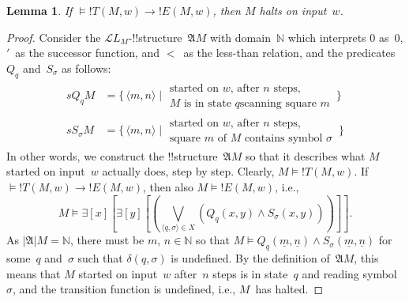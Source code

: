 \documentclass[10pt,a4paper]{article}
\theoremstyle{plain}
\newtheorem{lem}[thm]{Lemma}
\theoremstyle{definition}
\theoremstyle{remark}
\newcommand*{\ollabel}[1]{\label{#1}}
\providecommand{\lif}{\mathbin{\rightarrow}}
\providecommand{\lexists}{\mathord{\exists}}
\providecommand{\Entails}{\mathrel{\models}}
\providecommand{\Obj}{}
\providecommand{\Struct}{\ensuremath{\mathfrak{A}}}
\providecommand{\Domain}{\ensuremath{|\mathfrak{A}|}}
\providecommand{\Assign}{\ensuremath{s}}
\providecommand{\Sat}[2]{\ensuremath{#1 \models #2}}
\providecommand{\Lang}{\ensuremath{\mathcal{L}}}
\providecommand{\tuple}[1]{\langle #1 \rangle}
\providecommand{\num}[1]{\underline{#1}}
\providecommand{\Nat}{\ensuremath{\mathbb{N}}}
\providecommand{\Setabs}[2]{\{\, #1 \mid #2 \,\}}
\begin{document}
\begin{lem}
\ollabel{lem:halt-if-valid}
If $\Entails !T(M, w) \lif !E(M, w)$, then $M$ halts on input~$w$.
\end{lem}

\begin{proof}
Consider the $\Lang L_M$-!!{structure}~$\Struct M$ with
domain~$\Nat$ which interprets $\Obj 0$ as~$0$, $\prime$~as the successor
function, and $<$~as the less-than relation, and the predicates $\Obj Q_q$
and~$\Obj S_\sigma$ as follows:
\begin{align*}
  \Assign{\Obj Q_q}{M} & =
\Setabs{\tuple{m, n}}{\begin{array}{ll}\text{started on~$w$, after~$n$ steps,}\\ \text{$M$ is in state $q$
  scanning square~$m$}\end{array}} \\
\Assign{\Obj S_\sigma}{M} & = \Setabs{\tuple{m, n}}{\begin{array}{ll}
\text{started on~$w$, after $n$ steps,}\\ \text{square~$m$ of $M$ contains
  symbol~$\sigma$}\end{array}}
\end{align*}
In other words, we construct the !!{structure}~$\Struct{M}$ so that it
describes what $M$ started on input~$w$ actually does, step by step.
Clearly, $\Sat{M}{!T(M, w)}$. If $\Entails !T(M, w) \lif !E(M, w)$,
then also $\Sat{M}{!E(M, w)}$, i.e.,
\[
\Sat{M}{\lexists[x][\lexists[y][(\bigvee_{\tuple{q, \sigma} \in
      X}(\Obj Q_q(x, y) \land \Obj S_\sigma(x, y)))]]}.
\]
As $\Domain{M} = \Nat$, there must be $m$, $n \in \Nat$ so that
$\Sat{M}{\Obj Q_q(\num{m}, \num{n}) \land \Obj S_\sigma(\num{m},
\num{n})}$ for some~$q$ and~$\sigma$ such that $\delta(q, \sigma)$ is
undefined. By the definition of~$\Struct M$, this means that $M$
started on input~$w$ after~$n$ steps is in state~$q$ and reading
symbol~$\sigma$, and the transition function is undefined, i.e.,
$M$~has halted.
\end{proof}
\end{document}
